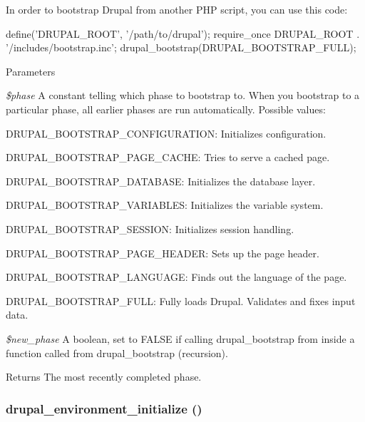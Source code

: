In order to bootstrap Drupal from another PHP script, you can use this code: 
\begin{DoxyCode}
   define('DRUPAL_ROOT', '/path/to/drupal');
   require_once DRUPAL_ROOT . '/includes/bootstrap.inc';
   drupal_bootstrap(DRUPAL_BOOTSTRAP_FULL);
\end{DoxyCode}



\begin{DoxyParams}{Parameters}
\item[{\em \$phase}]A constant telling which phase to bootstrap to. When you bootstrap to a particular phase, all earlier phases are run automatically. Possible values:
\begin{DoxyItemize}
\item DRUPAL\_\-BOOTSTRAP\_\-CONFIGURATION: Initializes configuration.
\item DRUPAL\_\-BOOTSTRAP\_\-PAGE\_\-CACHE: Tries to serve a cached page.
\item DRUPAL\_\-BOOTSTRAP\_\-DATABASE: Initializes the database layer.
\item DRUPAL\_\-BOOTSTRAP\_\-VARIABLES: Initializes the variable system.
\item DRUPAL\_\-BOOTSTRAP\_\-SESSION: Initializes session handling.
\item DRUPAL\_\-BOOTSTRAP\_\-PAGE\_\-HEADER: Sets up the page header.
\item DRUPAL\_\-BOOTSTRAP\_\-LANGUAGE: Finds out the language of the page.
\item DRUPAL\_\-BOOTSTRAP\_\-FULL: Fully loads Drupal. Validates and fixes input data. 
\end{DoxyItemize}\item[{\em \$new\_\-phase}]A boolean, set to FALSE if calling drupal\_\-bootstrap from inside a function called from drupal\_\-bootstrap (recursion).\end{DoxyParams}
\begin{DoxyReturn}{Returns}
The most recently completed phase. 
\end{DoxyReturn}
\hypertarget{bootstrap_8inc_a14319f2e33c7996576b203ed2bae9b62}{
\subsubsection[{drupal\_\-environment\_\-initialize}]{\setlength{\rightskip}{0pt plus 5cm}drupal\_\-environment\_\-initialize ()}}
